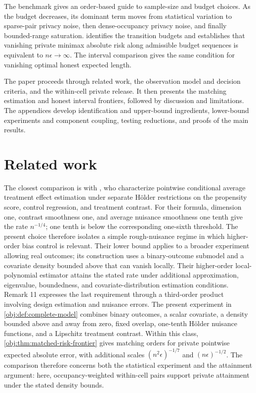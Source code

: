 \documentclass[11pt]{article}
\begin{document}
The benchmark gives an order-based guide to sample-size and budget choices. As the budget decreases, its dominant term moves from statistical variation to sparse-pair privacy noise, then dense-occupancy privacy noise, and finally bounded-range saturation.  identifies the transition budgets and establishes that vanishing private minimax absolute risk along admissible budget sequences is equivalent to \(n\epsilon\to\infty\). The interval comparison gives the same condition for vanishing optimal honest expected length.



The paper proceeds through related work, the observation model and decision criteria, and the within-cell private release. It then presents the matching estimation and honest interval frontiers, followed by discussion and limitations. The appendices develop identification and upper-bound ingredients, lower-bound experiments and component coupling, testing reductions, and proofs of the main results.


\section{Related work}\label{sec:related-work}

The closest comparison is with \citet[][Theorems 1--2 and Remarks 2 and 11]{KennedyBalakrishnanRobinsWasserman2024}, who characterize pointwise conditional average treatment effect estimation under separate H\"older restrictions on the propensity score, control regression, and treatment contrast. For their formula, dimension one, contrast smoothness one, and average nuisance smoothness one tenth give the rate \(n^{-1/4}\); one tenth is below the corresponding one-sixth threshold. The present choice therefore isolates a simple rough-nuisance regime in which higher-order bias control is relevant. Their lower bound applies to a broader experiment allowing real outcomes; its construction uses a binary-outcome submodel and a covariate density bounded above that can vanish locally. Their higher-order local-polynomial estimator attains the stated rate under additional approximation, eigenvalue, boundedness, and covariate-distribution estimation conditions. Remark 11 expresses the last requirement through a third-order product involving design estimation and nuisance errors. The present experiment in \cref{obj:def:complete-model} combines binary outcomes, a scalar covariate, a density bounded above and away from zero, fixed overlap, one-tenth H\"older nuisance functions, and a Lipschitz treatment contrast. Within this class, \cref{obj:thm:matched-risk-frontier} gives matching orders for private pointwise expected absolute error, with additional scales \((n^2\epsilon)^{-1/7}\) and \((n\epsilon)^{-1/2}\). The comparison therefore concerns both the statistical experiment and the attainment argument: here, occupancy-weighted within-cell pairs support private attainment under the stated density bounds.
\end{document}

